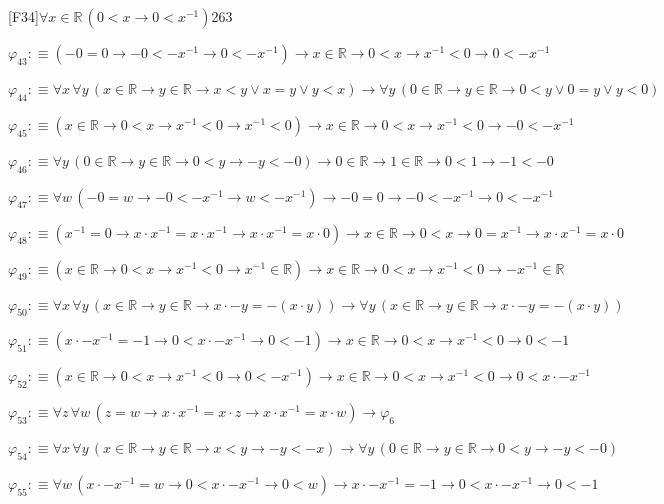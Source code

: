 \begin{fullproof}{[F34]}{$\forall x \in \mathbb{R}\,(0 < x \to 0 < x^{-1})$}{263}
\begin{abbrevlist}
\item $\varphi_{43} :\equiv (-0 = 0 \to -0 < -x^{-1} \to 0 < -x^{-1}) \to x \in \mathbb{R} \to 0 < x \to x^{-1} < 0 \to 0 < -x^{-1}$
\item $\varphi_{44} :\equiv \forall x\,\forall y\,(x \in \mathbb{R} \to y \in \mathbb{R} \to x < y \lor x = y \lor y < x) \to \forall y\,(0 \in \mathbb{R} \to y \in \mathbb{R} \to 0 < y \lor 0 = y \lor y < 0)$
\item $\varphi_{45} :\equiv (x \in \mathbb{R} \to 0 < x \to x^{-1} < 0 \to x^{-1} < 0) \to x \in \mathbb{R} \to 0 < x \to x^{-1} < 0 \to -0 < -x^{-1}$
\item $\varphi_{46} :\equiv \forall y\,(0 \in \mathbb{R} \to y \in \mathbb{R} \to 0 < y \to -y < -0) \to 0 \in \mathbb{R} \to 1 \in \mathbb{R} \to 0 < 1 \to -1 < -0$
\item $\varphi_{47} :\equiv \forall w\,(-0 = w \to -0 < -x^{-1} \to w < -x^{-1}) \to -0 = 0 \to -0 < -x^{-1} \to 0 < -x^{-1}$
\item $\varphi_{48} :\equiv (x^{-1} = 0 \to x \cdot x^{-1} = x \cdot x^{-1} \to x \cdot x^{-1} = x \cdot 0) \to x \in \mathbb{R} \to 0 < x \to 0 = x^{-1} \to x \cdot x^{-1} = x \cdot 0$
\item $\varphi_{49} :\equiv (x \in \mathbb{R} \to 0 < x \to x^{-1} < 0 \to x^{-1} \in \mathbb{R}) \to x \in \mathbb{R} \to 0 < x \to x^{-1} < 0 \to -x^{-1} \in \mathbb{R}$
\item $\varphi_{50} :\equiv \forall x\,\forall y\,(x \in \mathbb{R} \to y \in \mathbb{R} \to x \cdot -y = -(x \cdot y)) \to \forall y\,(x \in \mathbb{R} \to y \in \mathbb{R} \to x \cdot -y = -(x \cdot y))$
\item $\varphi_{51} :\equiv (x \cdot -x^{-1} = -1 \to 0 < x \cdot -x^{-1} \to 0 < -1) \to x \in \mathbb{R} \to 0 < x \to x^{-1} < 0 \to 0 < -1$
\item $\varphi_{52} :\equiv (x \in \mathbb{R} \to 0 < x \to x^{-1} < 0 \to 0 < -x^{-1}) \to x \in \mathbb{R} \to 0 < x \to x^{-1} < 0 \to 0 < x \cdot -x^{-1}$
\item $\varphi_{53} :\equiv \forall z\,\forall w\,(z = w \to x \cdot x^{-1} = x \cdot z \to x \cdot x^{-1} = x \cdot w) \to \varphi_{6}$
\item $\varphi_{54} :\equiv \forall x\,\forall y\,(x \in \mathbb{R} \to y \in \mathbb{R} \to x < y \to -y < -x) \to \forall y\,(0 \in \mathbb{R} \to y \in \mathbb{R} \to 0 < y \to -y < -0)$
\item $\varphi_{55} :\equiv \forall w\,(x \cdot -x^{-1} = w \to 0 < x \cdot -x^{-1} \to 0 < w) \to x \cdot -x^{-1} = -1 \to 0 < x \cdot -x^{-1} \to 0 < -1$

\end{abbrevlist}
\end{fullproof}
